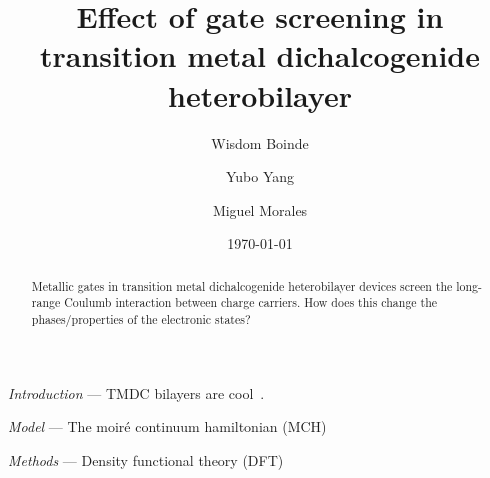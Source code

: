 \documentclass[aps,prb,showpacs,preprintnumbers,amsmath,amssymb,superscriptaddress,twocolumn]{revtex4-1}
\newcommand{\ssec}[1]{\emph{#1} ---}
\begin{document}
\title{Effect of gate screening in transition metal dichalcogenide heterobilayer}
\author{Wisdom Boinde}
\author{Yubo Yang}
\author{Miguel Morales}
\date{\today}
\begin{abstract}
Metallic gates in transition metal dichalcogenide heterobilayer devices screen the long-range Coulumb interaction between charge carriers.
How does this change the phases/properties of the electronic states?
\end{abstract}
\pacs{}
\maketitle

\ssec{Introduction}
TMDC bilayers are cool~\cite{Mak2022}.

\ssec{Model}
The moir\'e continuum hamiltonian (MCH)

\ssec{Methods}
Density functional theory (DFT)
\end{document}
